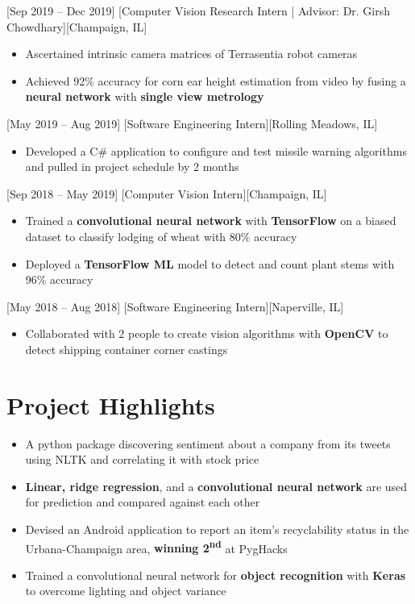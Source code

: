 \documentclass{article}
\begin{document}
[Sep 2019 -- Dec 2019]
[Computer Vision Research Intern | Advisor: Dr. Girsh Chowdhary][Champaign, IL]
\begin{itemize}
    \item Ascertained intrinsic camera matrices of Terrasentia robot cameras
    \item Achieved 92\% accuracy for corn ear height estimation from video by fusing a \textbf{neural network} with \textbf{single view metrology}
\end{itemize}

[May 2019 -- Aug 2019]
[Software Engineering Intern][Rolling Meadows, IL]
\begin{itemize}
    \item Developed a C\# application to configure and test missile warning algorithms
    and pulled in project schedule by 2 months 
\end{itemize}

[Sep 2018 -- May 2019]
[Computer Vision Intern][Champaign, IL]
\begin{itemize}
    \item Trained a \textbf{convolutional neural network} with \textbf{TensorFlow} on a biased dataset to classify lodging of wheat with 80\% accuracy
    \item Deployed a \textbf{TensorFlow ML} model to detect and count plant stems with 96\% accuracy
\end{itemize}

[May 2018 -- Aug 2018]
[Software Engineering Intern][Naperville, IL]
\begin{itemize}
    \item Collaborated with 2 people to create vision algorithms with \textbf{OpenCV} to detect shipping container corner castings
\end{itemize}

\section{Project Highlights}
\begin{itemize}
    \item A python package discovering sentiment about a company from its tweets using NLTK and correlating it with stock price
    \item \textbf{Linear, ridge regression}, and a \textbf{convolutional neural network} are used for prediction and compared against each other
\end{itemize}
\begin{itemize}
    \item Devised an Android application to report an item's recyclability status in the Urbana-Champaign area, \textbf{winning 2\textsuperscript{nd}} at PygHacks 
    \item Trained a convolutional neural network for \textbf{object recognition} with \textbf{Keras} to overcome lighting and object variance
\end{itemize}
\end{document}
